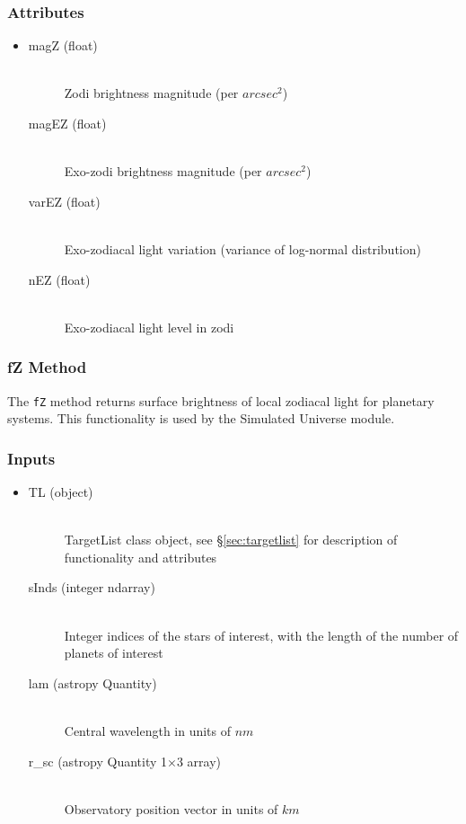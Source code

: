 \documentclass[cleanfoot]{asme2ej}
\begin{document}
\subsubsection*{Attributes}
\begin{itemize}
\item
\begin{description}
        \item[magZ (float)] \hfill \\
        Zodi brightness magnitude (per $ arcsec^2 $)
        \item[magEZ (float)] \hfill \\
        Exo-zodi brightness magnitude (per $ arcsec^2 $)
        \item[varEZ (float)] \hfill \\
        Exo-zodiacal light variation (variance of log-normal distribution)
        \item[nEZ (float)] \hfill \\
        Exo-zodiacal light level in zodi
\end{description}
\end{itemize}

\subsubsection{fZ Method} \label{sec:fZtask}
The \verb+fZ+ method returns surface brightness of local zodiacal light for planetary systems.  This functionality is used by the Simulated Universe module.

\subsubsection*{Inputs}
\begin{itemize}
    \item 
    \begin{description}
        \item[TL (object)] \hfill \\ TargetList class object, see \S\ref{sec:targetlist} for description of functionality and attributes       
        \item[sInds (integer ndarray)] \hfill \\ Integer indices of the stars of interest, with the length of the number of planets of interest
        \item[lam (astropy Quantity)] \hfill \\ Central wavelength in units of $ nm $
        \item[r\_sc (astropy Quantity 1$\times$3 array)] \hfill \\ Observatory position vector in units of $ km $
    \end{description}
\end{itemize}
\end{document}
